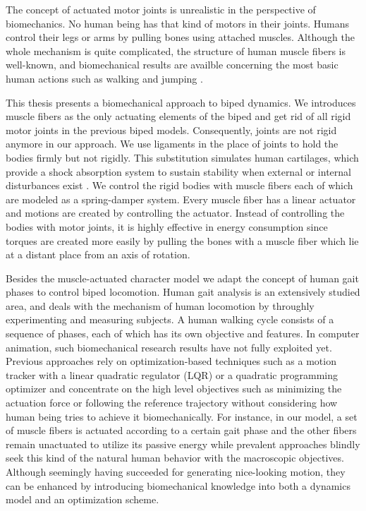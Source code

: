 \documentclass[a4paper,10pt]{article}
\begin{document}
The concept of actuated motor joints is unrealistic in the perspective of
biomechanics. No human being has that kind of motors in their joints.
Humans control their legs or arms by pulling bones using attached
muscles. Although the whole mechanism is quite complicated,
the structure of human muscle fibers is well-known, and biomechanical
results are availble concerning the most basic human actions
such as walking and jumping \cite{citeulike:2547705, citeulike:7093575}.

This thesis presents a biomechanical approach to biped dynamics. We
introduces muscle fibers as the only actuating elements
of the biped and get rid of all rigid motor joints in the previous biped
models. Consequently, joints are not rigid anymore in our approach.
We use ligaments in the place of joints
to hold the bodies firmly but not rigidly. This substitution
simulates human cartilages, which provide a shock absorption
system to sustain stability when external or internal disturbances exist \cite{shock}.
We control the rigid bodies with muscle fibers each of which are modeled as
a spring-damper system. Every muscle fiber has a linear actuator and
motions are created by controlling the actuator. Instead of controlling
the bodies with motor joints, it is highly effective in energy consumption
since torques are created more easily by pulling the bones with a muscle
fiber which lie at a distant place from an axis of rotation.

Besides the muscle-actuated character model we adapt the concept of
human gait phases to control biped locomotion. Human gait analysis is an extensively
studied area, and deals with the mechanism of human locomotion
by throughly experimenting and measuring subjects.
A human walking cycle consists of a sequence of phases, each of which has
its own objective and features.
In computer animation, such biomechanical research results have not fully exploited yet.
Previous approaches rely on optimization-based
techniques such as a motion tracker with a linear quadratic regulator (LQR)
or a quadratic programming optimizer and concentrate on the high level
objectives such as minimizing the actuation force or following the reference
trajectory without considering how human being tries
to achieve it biomechanically. For instance, in our model, a set of muscle fibers is
actuated according to a certain gait phase and the other fibers remain
unactuated to utilize its passive energy while prevalent approaches blindly seek 
this kind of the natural human behavior with the macroscopic objectives.
Although seemingly having succeeded for generating nice-looking motion,
they can be enhanced by introducing biomechanical knowledge into both
a dynamics model and an optimization scheme.
\end{document}
